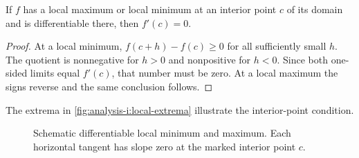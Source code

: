 \begin{proposition}
  \label{thm:analysis-i:interior-extremum}
  If $f$ has a local maximum or local minimum at an interior point $c$
  of its domain and is differentiable there, then $f'(c)=0$.
\end{proposition}
\begin{proof}
  At a local minimum, $f(c+h)-f(c)\ge0$ for all sufficiently small $h$.
  The quotient is nonnegative for $h>0$ and nonpositive for $h<0$.
  Since both one-sided limits equal $f'(c)$, that number must be zero.
  At a local maximum the signs reverse and the same conclusion follows.
\end{proof}
The extrema in \autoref{fig:analysis-i:local-extrema} illustrate the
interior-point condition.
\begin{figure}
  \centering
  
  \caption[Interior stationary extrema.]{Schematic
    differentiable local minimum and maximum. Each horizontal tangent has
    slope zero at the marked interior point $c$.}
  \label{fig:analysis-i:local-extrema}
\end{figure}
